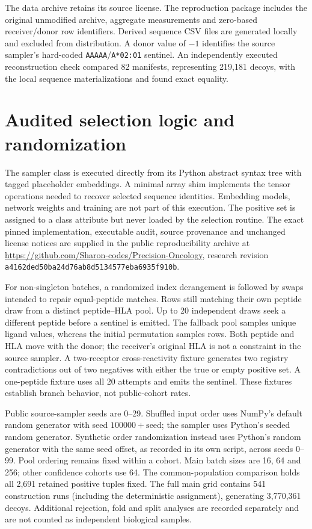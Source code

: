 \documentclass[11pt,a4paper]{article}
\begin{document}
The data archive retains its source license. The reproduction package includes the original unmodified archive, aggregate measurements and zero-based receiver/donor row identifiers. Derived sequence CSV files are generated locally and excluded from distribution. A donor value of $-1$ identifies the source sampler's hard-coded \texttt{AAAAA}/\texttt{A*02:01} sentinel. An independently executed reconstruction check compared 82 manifests, representing 219,181 decoys, with the local sequence materializations and found exact equality.

\section{Audited selection logic and randomization}
The sampler class is executed directly from its Python abstract syntax tree with tagged placeholder embeddings. A minimal array shim implements the tensor operations needed to recover selected sequence identities. Embedding models, network weights and training are not part of this execution. The positive set is assigned to a class attribute but never loaded by the selection routine. The exact pinned implementation, executable audit, source provenance and unchanged license notices are supplied in the public reproducibility archive at \url{https://github.com/Sharon-codes/Precision-Oncology}, research revision \texttt{a4162ded50ba24d76ab8d5134577eba6935f910b}.

For non-singleton batches, a randomized index derangement is followed by swaps intended to repair equal-peptide matches. Rows still matching their own peptide draw from a distinct peptide--HLA pool. Up to 20 independent draws seek a different peptide before a sentinel is emitted. The fallback pool samples unique ligand values, whereas the initial permutation samples rows. Both peptide and HLA move with the donor; the receiver's original HLA is not a constraint in the source sampler. A two-receptor cross-reactivity fixture generates two registry contradictions out of two negatives with either the true or empty positive set. A one-peptide fixture uses all 20 attempts and emits the sentinel. These fixtures establish branch behavior, not public-cohort rates.

Public source-sampler seeds are 0--29. Shuffled input order uses NumPy's default random generator with seed $100000+\mathrm{seed}$; the sampler uses Python's seeded random generator. Synthetic order randomization instead uses Python's random generator with the same seed offset, as recorded in its own script, across seeds 0--99. Pool ordering remains fixed within a cohort. Main batch sizes are 16, 64 and 256; other confidence cohorts use 64. The common-population comparison holds all 2,691 retained positive tuples fixed. The full main grid contains 541 construction runs (including the deterministic assignment), generating 3,770,361 decoys. Additional rejection, fold and split analyses are recorded separately and are not counted as independent biological samples.
\end{document}
